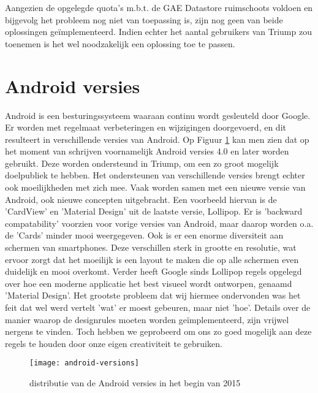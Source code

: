 Aangezien de opgelegde quota's m.b.t. de GAE Datastore ruimschoots voldoen en bijgevolg het probleem nog niet van toepassing is, zijn nog geen van beide oplossingen geïmplementeerd.
Indien echter het aantal gebruikers van Triump zou toenemen is het wel noodzakelijk een oplossing toe te passen.

\section{Android versies}

Android is een besturingssysteem waaraan continu wordt gesleuteld door Google. Er worden met regelmaat verbeteringen en wijzigingen doorgevoerd, en dit resulteert in verschillende versies van Android.
Op Figuur \ref{fig:android_versions} kan men zien dat op het moment van schrijven voornamelijk Android versies 4.0 en later worden gebruikt. Deze worden ondersteund in Triump, om een zo groot mogelijk doelpubliek te hebben. Het ondersteunen van verschillende versies brengt echter ook moeilijkheden met zich mee. Vaak worden samen met een nieuwe versie van Android, ook nieuwe concepten uitgebracht.
Een voorbeeld hiervan is de 'CardView' en 'Material Design' uit de laatste versie, Lollipop. Er is 'backward compatability' voorzien voor vorige versies van Android, maar daarop worden o.a. de 'Cards' minder mooi weergegeven.
Ook is er een enorme diversiteit aan schermen van smartphones. Deze verschillen sterk in grootte en resolutie, wat ervoor zorgt dat het moeilijk is een layout te maken die op alle schermen even duidelijk en mooi overkomt.
Verder heeft Google sinds Lollipop regels opgelegd over hoe een moderne applicatie het best visueel wordt ontworpen, genaamd 'Material Design'. Het grootste probleem dat wij hiermee ondervonden was het feit dat wel werd vertelt 'wat' er moest gebeuren, maar niet 'hoe'. Details over de manier waarop de designrules moeten worden geïmplementeerd, zijn vrijwel nergens te vinden. Toch hebben we geprobeerd om ons zo goed mogelijk aan deze regels te houden door onze eigen creativiteit te gebruiken.
\begin{figure}[H]
	\centering
	\texttt{[image: android-versions]}
	\caption{distributie van de Android versies in het begin van 2015}
	\label{fig:android_versions}
\end{figure}

